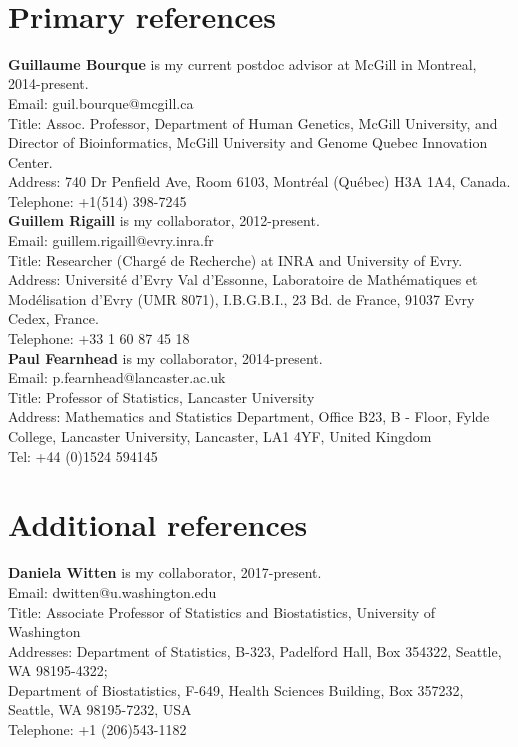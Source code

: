 \documentclass{article}
\begin{document}
\mbox{ }

\section*{Primary references}

{\bf Guillaume Bourque} is my current postdoc advisor at McGill in Montreal, 2014-present.\\
Email: guil.bourque@mcgill.ca\\
Title: Assoc. Professor, Department of Human Genetics, McGill University, and\\
Director of Bioinformatics, McGill University and Genome Quebec Innovation Center. \\
Address: 740 Dr Penfield Ave, Room 6103, Montréal (Québec) H3A 1A4, Canada.\\
Telephone: +1(514) 398-7245\\

{\bf Guillem Rigaill} is my collaborator, 2012-present.\\
Email: guillem.rigaill@evry.inra.fr\\
Title: Researcher (Charg\'e de Recherche) at INRA and University of Evry.\\
Address: Universit\'e d'Evry Val d'Essonne,
Laboratoire de Math\'ematiques et Mod\'elisation d'Evry (UMR 8071),
I.B.G.B.I., 23 Bd. de France, 91037 Evry Cedex,
France.\\
Telephone: +33 1 60 87 45 18\\

{\bf Paul Fearnhead} is my collaborator, 2014-present.\\
Email: p.fearnhead@lancaster.ac.uk\\
Title: Professor of Statistics, Lancaster University\\
Address: Mathematics and Statistics Department,
Office B23, B - Floor, Fylde College,
Lancaster University,
Lancaster, LA1 4YF,
United Kingdom\\
Tel: +44 (0)1524 594145\\

\section*{Additional references}

{\bf Daniela Witten} is my collaborator, 2017-present.\\
Email: dwitten@u.washington.edu\\
Title: Associate Professor of Statistics and Biostatistics, University of Washington\\
Addresses:
Department of Statistics,
B-323, Padelford Hall, Box 354322,
Seattle, WA 98195-4322;\\
Department of Biostatistics,
F-649, Health Sciences Building, Box 357232,
Seattle, WA 98195-7232,
USA\\
Telephone: +1 (206)543-1182\\
\end{document}
